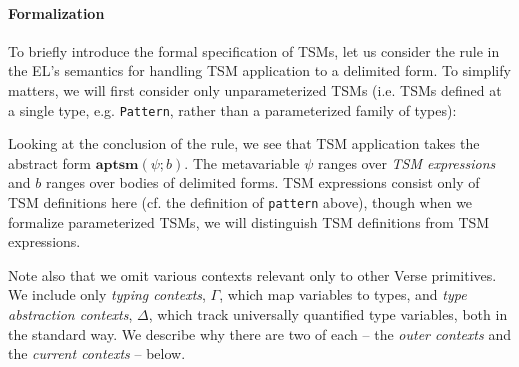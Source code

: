 \paragraph{Formalization} To briefly introduce the formal specification of TSMs, let us consider the rule in the EL's semantics for handling TSM application to a delimited form. To simplify matters, we will first consider only unparameterized TSMs (i.e. TSMs defined at a single type, e.g. \lstinline{Pattern}, rather than a parameterized family of types): 
\begin{mathpar}
\end{mathpar}
Looking at the conclusion of the rule, we see that TSM application takes the abstract form $\mathbf{aptsm}(\psi; b)$. The metavariable $\psi$ ranges over \emph{TSM expressions} and $b$ ranges over {bodies} of delimited forms. TSM expressions consist only of TSM definitions here (cf. the definition of \lstinline{pattern} above), though when we formalize parameterized TSMs, we will distinguish TSM definitions from TSM expressions.%

Note also that we omit various contexts relevant only to other Verse primitives. We include only \emph{typing contexts}, $\Gamma$, which map variables to types, and \emph{type abstraction contexts}, $\Delta$, which track universally quantified type variables, both in the standard way. We describe why there are two of each -- the \emph{outer contexts} and the \emph{current contexts} -- below. 


